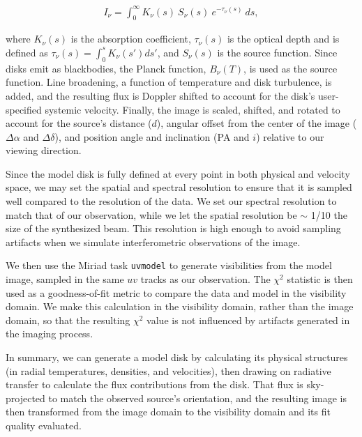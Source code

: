 \begin{align}
  I_\nu = \int_0^{\infty} K_\nu(s)\ S_\nu(s)\ e^{-\tau_\nu(s)}\ ds,
\end{align}

where $K_\nu(s)$ is the absorption coefficient, $\tau_\nu(s)$ is the optical depth and is defined as $\tau_\nu(s) = \int_0^s K_\nu(s') ds'$, and $S_\nu(s)$ is the source function. Since disks emit as blackbodies, the Planck function, $B_\nu(T)$, is used as the source function. Line broadening, a function of temperature and disk turbulence, is added, and the resulting flux is Doppler shifted to account for the disk's user-specified systemic velocity. Finally, the image is scaled, shifted, and rotated to account for the source's distance ($d$), angular offset from the center of the image ($\Delta \alpha$ and $\Delta \delta$), and position angle and inclination (PA and $i$) relative to our viewing direction.

Since the model disk is fully defined at every point in both physical and velocity space, we may set the spatial and spectral resolution to ensure that it is sampled well compared to the resolution of the data. We set our spectral resolution to match that of our observation, while we let the spatial resolution be $\sim$ 1/10 the size of the synthesized beam. This resolution is high enough to avoid sampling artifacts when we simulate interferometric observations of the image.


We then use the Miriad task \texttt{uvmodel} to generate visibilities from the model image, sampled in the same $uv$ tracks as our observation. The $\chi^2$ statistic is then used as a goodness-of-fit metric to compare the data and model in the visibility domain. We make this calculation in the visibility domain, rather than the image domain, so that the resulting $\chi^2$ value is not influenced by artifacts generated in the imaging process.


In summary, we can generate a model disk by calculating its physical structures (in radial temperatures, densities, and velocities), then drawing on radiative transfer to calculate the flux contributions from the disk. That flux is sky-projected to match the observed source's orientation, and the resulting image is then transformed from the image domain to the visibility domain and its fit quality evaluated.




